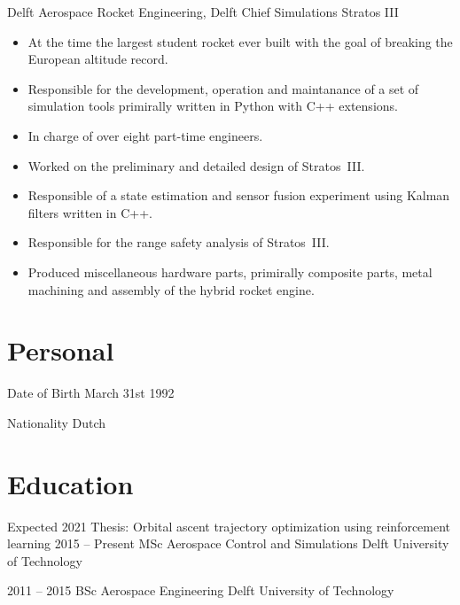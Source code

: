 \documentclass{tccv}
\begin{document}
\begin{eventlist}
     {Delft Aerospace Rocket Engineering, Delft}
     {Chief Simulations Stratos III}
\begin{itemize}
    \item{At the time the largest student rocket ever built with the goal of breaking the European altitude record.}
    \item{Responsible for the development, operation and maintanance of a set of simulation tools primirally written in Python with C++ extensions.}
    \item{In charge of over eight part-time engineers.}
    \item{Worked on the preliminary and detailed design of \linebreak Stratos~III.}
    \item{Responsible of a state estimation and sensor fusion experiment using Kalman filters written in C++.}
    \item{Responsible for the range safety analysis of Stratos~III.}
    \item{Produced miscellaneous hardware parts, primirally \linebreak composite parts, metal machining and assembly of the hybrid rocket engine.}
\end{itemize}

\end{eventlist}


\section{Personal}
\begin{factlist}
    \item{Date of Birth}
         {March 31st 1992}
    \item{Nationality}
         {Dutch}
\end{factlist}

\section{Education}

\begin{yearlist}

\item[Expected 2021 \hspace*{\fill} \linebreak Thesis: Orbital ascent trajectory optimization using reinforcement learning]
    {2015 -- Present}
    {MSc Aerospace Control and Simulations}
    {Delft University of Technology}

\item{2011 -- 2015}
    {BSc Aerospace Engineering}
    {Delft University of Technology}

\end{yearlist}
\end{document}
